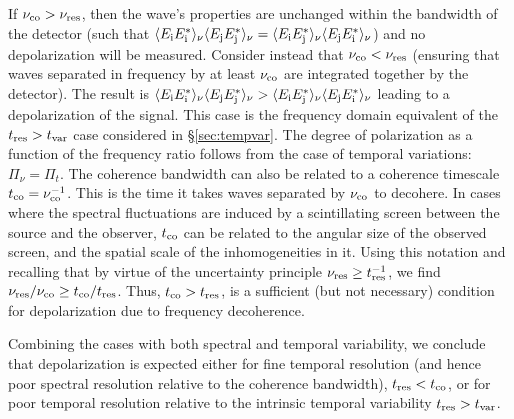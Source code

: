 \documentclass[fleqn,usenatbib]{mnras}
\begin{document}
	If $\nu_{\rm co}>\nu_{\rm res}$, then the wave's properties are unchanged within the bandwidth of the detector (such that $\langle E_{\rm i}E_{\rm i}^*\rangle_{\nu} \langle E_{\rm j}E_{\rm j}^*\rangle_{\nu}=\langle E_{\rm i}E_{\rm j}^*\rangle_{\nu} \langle E_{\rm j}E_{\rm i}^*\rangle_{\nu}$) and no depolarization will be measured.
	Consider instead that $\nu_{\rm co} < \nu_{\rm res}$ (ensuring that waves separated in frequency by at least $\nu_{\rm co}$ are integrated together by the detector). The result is $\langle E_{\rm i}E_{\rm i}^*\rangle_{\nu} \langle E_{\rm j}E_{\rm j}^*\rangle_{\nu}>\langle E_{\rm i}E_{\rm j}^*\rangle_{\nu} \langle E_{\rm j}E_{\rm i}^*\rangle_{\nu}$ leading to a depolarization of the signal. This case is the frequency domain equivalent of the $t_{\rm res}>t_{\rm var}$ case considered in \S \ref{sec:tempvar}. The degree of polarization as a function of the frequency ratio follows from the case of temporal variations: $\Pi_{\nu}=\Pi_t$.
	The coherence bandwidth can also be related to a coherence timescale $t_{\rm co}=\nu_{\rm co}^{-1}$. This is the time it takes waves separated by $\nu_{\rm co}$ to decohere. In cases where the spectral fluctuations are induced by a scintillating screen between the source and the observer, $t_{\rm co}$ can be related to the angular size of the observed screen, and the spatial scale of the inhomogeneities in it. Using this notation and recalling that by virtue of the uncertainty principle $\nu_{\rm res}\geq t_{\rm res}^{-1}$, we find $\nu_{\rm res}/\nu_{\rm co}\geq t_{\rm co}/t_{\rm res}$. Thus, $t_{\rm co}>t_{\rm res}$, is a sufficient (but not necessary) condition for depolarization due to frequency decoherence. 
	
	Combining the cases with both spectral and temporal variability, we conclude that depolarization is expected either for fine temporal resolution (and hence poor spectral resolution relative to the coherence bandwidth), $t_{\rm res}<t_{\rm co}$, or for poor temporal resolution relative to the intrinsic temporal variability $t_{\rm res}>t_{\rm var}$. 
	
\end{document}
